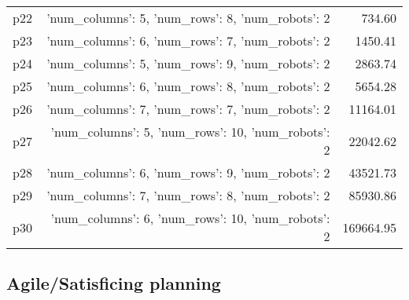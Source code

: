 \documentclass{article}
\begin{document}
\begin{center}
\begin{tabular}{@{}l|r|r@{}}
  p22&{'num\_columns': 5, 'num\_rows': 8, 'num\_robots': 2}&734.60\\
  p23&{'num\_columns': 6, 'num\_rows': 7, 'num\_robots': 2}&1450.41\\
  p24&{'num\_columns': 5, 'num\_rows': 9, 'num\_robots': 2}&2863.74\\
  p25&{'num\_columns': 6, 'num\_rows': 8, 'num\_robots': 2}&5654.28\\
  p26&{'num\_columns': 7, 'num\_rows': 7, 'num\_robots': 2}&11164.01\\
  p27&{'num\_columns': 5, 'num\_rows': 10, 'num\_robots': 2}&22042.62\\
  p28&{'num\_columns': 6, 'num\_rows': 9, 'num\_robots': 2}&43521.73\\
  p29&{'num\_columns': 7, 'num\_rows': 8, 'num\_robots': 2}&85930.86\\
  p30&{'num\_columns': 6, 'num\_rows': 10, 'num\_robots': 2}&169664.95
                            \end{tabular}
                            \end{center}
                    

                                \subsection*{Agile/Satisficing planning}
                                
\end{document}
